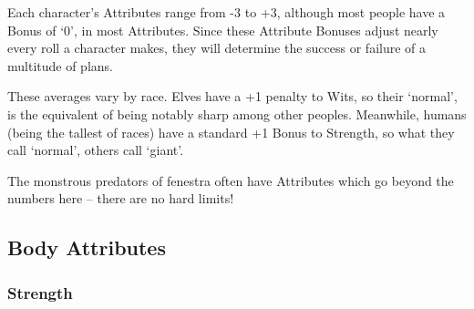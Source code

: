 \begin{multicols}{2}


\noindent
Each character's Attributes range from -3 to +3, although most people have a Bonus of `0', in most Attributes.
Since these Attribute Bonuses adjust nearly every roll a character makes, they will determine the success or failure of a multitude of plans.

These averages vary by race.
Elves have a +1 penalty to Wits, so their `normal', is the equivalent of being notably sharp among other peoples.
Meanwhile, humans (being the tallest of races) have a standard +1 Bonus to Strength, so what they call `normal', others call `giant'.

The monstrous predators of \gls{fenestra} often have Attributes which go beyond the numbers here -- there are no hard limits!

\subsection{Body Attributes}


\subsubsection[Strength]{Strength }


\end{multicols}
